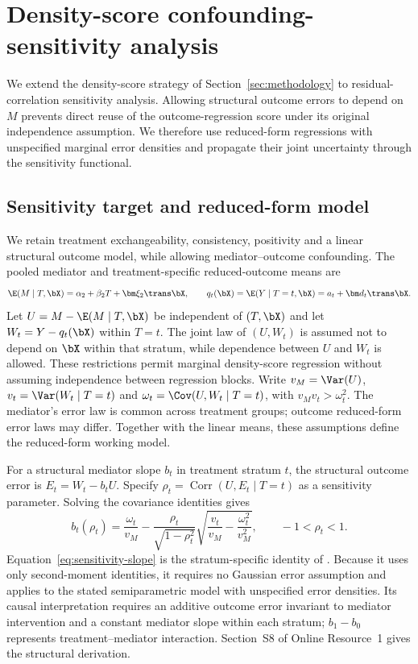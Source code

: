\section{Density-score confounding-sensitivity analysis}
\label{sec:confounding}

We extend the density-score strategy of Section~\ref{sec:methodology} to residual-correlation sensitivity analysis. Allowing structural outcome errors to depend on $M$ prevents direct reuse of the outcome-regression score under its original independence assumption. We therefore use reduced-form regressions with unspecified marginal error densities and propagate their joint uncertainty through the sensitivity functional.

\subsection{Sensitivity target and reduced-form model}

We retain treatment exchangeability, consistency, positivity and a linear structural outcome model, while allowing mediator--outcome confounding. The pooled mediator and treatment-specific reduced-outcome means are
\[
\E(M\mid T,\bX)=\alpha_2+\beta_2T+\bm\xi_2\trans\bX,
\qquad q_t(\bX)=\E(Y\mid T=t,\bX)=a_t+\bm d_t\trans\bX.
\]
Let $U=M-\E(M\mid T,\bX)$ be independent of $(T,\bX)$ and let $W_t=Y-q_t(\bX)$ within $T=t$. The joint law of $(U,W_t)$ is assumed not to depend on $\bX$ within that stratum, while dependence between $U$ and $W_t$ is allowed. These restrictions permit marginal density-score regression without assuming independence between regression blocks. Write $v_M=\Var(U)$, $v_t=\Var(W_t\mid T=t)$ and $\omega_t=\Cov(U,W_t\mid T=t)$, with $v_Mv_t>\omega_t^2$. The mediator's error law is common across treatment groups; outcome reduced-form error laws may differ. Together with the linear means, these assumptions define the reduced-form working model.

For a structural mediator slope $b_t$ in treatment stratum $t$, the structural outcome error is $E_t=W_t-b_tU$. Specify $\rho_t=\operatorname{Corr}(U,E_t\mid T=t)$ as a sensitivity parameter. Solving the covariance identities gives
\begin{equation}
b_t(\rho_t)=\frac{\omega_t}{v_M}
-\frac{\rho_t}{\sqrt{1-\rho_t^2}}
\sqrt{\frac{v_t}{v_M}-\frac{\omega_t^2}{v_M^2}},
\qquad -1<\rho_t<1.
\label{eq:sensitivity-slope}
\end{equation}
Equation~\eqref{eq:sensitivity-slope} is the stratum-specific identity of \citet[Section~5 and Appendix~D]{imai2010a}. Because it uses only second-moment identities, it requires no Gaussian error assumption and applies to the stated semiparametric model with unspecified error densities. Its causal interpretation requires an additive outcome error invariant to mediator intervention and a constant mediator slope within each stratum; $b_1-b_0$ represents treatment--mediator interaction. Section~S8 of Online Resource~1 gives the structural derivation.

